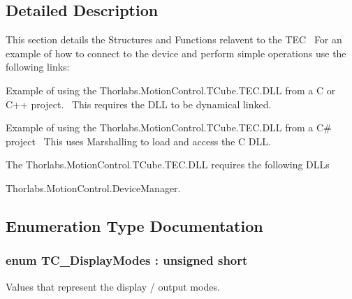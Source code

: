 \subsection{Detailed Description}
This section details the Structures and Functions relavent to the T\+EC~\newline
 For an example of how to connect to the device and perform simple operations use the following links\+: 
\begin{DoxyItemize}
\item Example of using the Thorlabs.Motion\+Control.T\+Cube.T\+EC.D\+LL from a C or C++ project.~\newline
 This requires the D\+LL to be dynamical linked.  
\item Example of using the Thorlabs.Motion\+Control.T\+Cube.T\+EC.D\+LL from a C\# project~\newline
 This uses Marshalling to load and access the C D\+LL.  
\end{DoxyItemize}The Thorlabs.\+Motion\+Control.\+T\+Cube.\+T\+E\+C.\+D\+LL requires the following D\+L\+Ls 
\begin{DoxyItemize}
\item Thorlabs.\+Motion\+Control.\+Device\+Manager.  
\end{DoxyItemize}

\subsection{Enumeration Type Documentation}
\subsubsection[{\texorpdfstring{T\+C\+\_\+\+Display\+Modes}{TC_DisplayModes}}]{\setlength{\rightskip}{0pt plus 5cm}enum {\bf T\+C\+\_\+\+Display\+Modes} \+: unsigned short}\hypertarget{group___t_cube_t_e_c_ga7651aeacb4e7e5a56465439d31bd547b}{}\label{group___t_cube_t_e_c_ga7651aeacb4e7e5a56465439d31bd547b}


Values that represent the display / output modes. 

